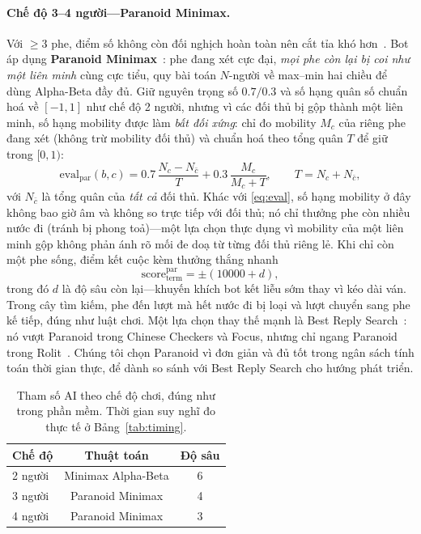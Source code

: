 \paragraph{Chế độ 3--4 người---Paranoid Minimax.} Với $\ge 3$ phe, điểm
số không còn đối nghịch hoàn toàn nên cắt tỉa khó
hơn~\citep{korf1991multiplayer,sturtevant2000pruning}. Bot áp dụng
\textbf{Paranoid Minimax}~\citep{sturtevant2000pruning,sturtevant2003comparison}:
phe đang xét cực đại, \emph{mọi phe còn
lại bị coi như một liên minh} cùng cực tiểu, quy bài toán $N$-người về
max--min hai chiều để dùng Alpha-Beta đầy đủ. Giữ nguyên trọng số $0.7/0.3$
và số hạng quân số chuẩn hoá về $[-1,1]$ như chế độ 2 người, nhưng vì các
đối thủ bị gộp thành một liên minh, số hạng mobility được làm \emph{bất đối
xứng}: chỉ đo mobility $M_c$ của riêng phe đang xét (không trừ mobility đối
thủ) và chuẩn hoá theo tổng quân $T$ để giữ trong $[0,1)$:
\begin{equation}
\mathrm{eval}_{\text{par}}(b,c)=0.7\,\frac{N_c-N_{\bar c}}{T}
+0.3\,\frac{M_c}{M_c+T},\qquad T=N_c+N_{\bar c},
\label{eq:evalpar}
\end{equation}
với $N_{\bar c}$ là tổng quân của \emph{tất cả} đối thủ. Khác với
\eqref{eq:eval}, số hạng mobility ở đây không bao giờ âm và không so trực
tiếp với đối thủ; nó chỉ thưởng phe còn nhiều nước đi (tránh bị phong
toả)---một lựa chọn thực dụng vì mobility của một liên minh gộp không phản
ánh rõ mối đe doạ từ từng đối thủ riêng lẻ. Khi chỉ còn một
phe sống, điểm kết cuộc kèm thưởng thắng nhanh
\begin{equation}
\mathrm{score}^{\text{par}}_{\text{term}}=\pm(10000+d),
\label{eq:termpar}
\end{equation}
trong đó $d$ là độ sâu còn lại---khuyến khích bot kết liễu sớm thay vì
kéo dài ván. Trong cây tìm kiếm, phe đến lượt mà hết nước đi bị loại và
lượt chuyển sang phe kế tiếp, đúng như luật chơi. Một lựa chọn thay thế mạnh là Best Reply
Search~\citep{schadd2011brs}: nó vượt Paranoid trong Chinese Checkers và
Focus, nhưng chỉ ngang Paranoid trong Rolit~\citep{schadd2011brs,nijssen2013mcts}.
Chúng tôi chọn Paranoid vì đơn giản và đủ tốt trong ngân sách
tính toán thời gian thực, để dành so sánh với Best Reply Search cho hướng
phát triển.

\begin{table}[H]
  \centering
  \caption{Tham số AI theo chế độ chơi, đúng như trong phần mềm. Thời gian
  suy nghĩ đo thực tế ở Bảng~\ref{tab:timing}.}
  \label{tab:ai_params}
  \begin{tabular}{lcc}
    \toprule
    \textbf{Chế độ} & \textbf{Thuật toán} & \textbf{Độ sâu} \\
    \midrule
    2 người & Minimax Alpha-Beta & 6 \\
    3 người & Paranoid Minimax   & 4 \\
    4 người & Paranoid Minimax   & 3 \\
    \bottomrule
  \end{tabular}
\end{table}

